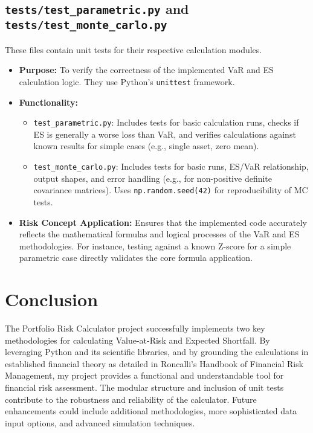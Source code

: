 \documentclass[11pt,a4paper]{article}
\begin{document}
\subsection{\texttt{tests/test\_parametric.py} and \texttt{tests/test\_monte\_carlo.py}}
These files contain unit tests for their respective calculation modules.
\begin{itemize}
    \item \textbf{Purpose:} To verify the correctness of the implemented VaR and ES calculation logic. They use Python's \texttt{unittest} framework.
    \item \textbf{Functionality:}
        \begin{itemize}
            \item \texttt{test\_parametric.py}: Includes tests for basic calculation runs, checks if ES is generally a worse loss than VaR, and verifies calculations against known results for simple cases (e.g., single asset, zero mean).
            \item \texttt{test\_monte\_carlo.py}: Includes tests for basic runs, ES/VaR relationship, output shapes, and error handling (e.g., for non-positive definite covariance matrices). Uses \texttt{np.random.seed(42)} for reproducibility of MC tests.
        \end{itemize}
    \item \textbf{Risk Concept Application:} Ensures that the implemented code accurately reflects the mathematical formulas and logical processes of the VaR and ES methodologies. For instance, testing against a known Z-score for a simple parametric case directly validates the core formula application.
\end{itemize}

\section{Conclusion}
The Portfolio Risk Calculator project successfully implements two key methodologies for calculating Value-at-Risk and Expected Shortfall. By leveraging Python and its scientific libraries, and by grounding the calculations in established financial theory as detailed in Roncalli's Handbook of Financial Risk Management, my project provides a functional and understandable tool for financial risk assessment. The modular structure and inclusion of unit tests contribute to the robustness and reliability of the calculator. Future enhancements could include additional methodologies, more sophisticated data input options, and advanced simulation techniques.
\end{document}
